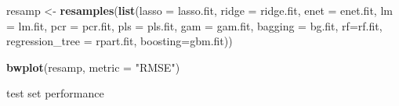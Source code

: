 \documentclass[]{article}
\newenvironment{Shaded}{\begin{snugshade}}{\end{snugshade}}
\newcommand{\DataTypeTok}[1]{\textcolor[rgb]{0.13,0.29,0.53}{#1}}
\newcommand{\KeywordTok}[1]{\textcolor[rgb]{0.13,0.29,0.53}{\textbf{#1}}}
\newcommand{\NormalTok}[1]{#1}
\newcommand{\StringTok}[1]{\textcolor[rgb]{0.31,0.60,0.02}{#1}}
\begin{document}
\begin{Shaded}
\begin{Highlighting}[]
\NormalTok{resamp <-}\StringTok{ }\KeywordTok{resamples}\NormalTok{(}\KeywordTok{list}\NormalTok{(}\DataTypeTok{lasso =}\NormalTok{ lasso.fit, }
                         \DataTypeTok{ridge =}\NormalTok{ ridge.fit,}
                         \DataTypeTok{enet =}\NormalTok{ enet.fit,}
                         \DataTypeTok{lm =}\NormalTok{ lm.fit,}
                         \DataTypeTok{pcr =}\NormalTok{ pcr.fit,}
                         \DataTypeTok{pls =}\NormalTok{ pls.fit,}
                         \DataTypeTok{gam =}\NormalTok{ gam.fit,}
                         \DataTypeTok{bagging =}\NormalTok{ bg.fit,}
                         \DataTypeTok{rf=}\NormalTok{rf.fit,}
                         \DataTypeTok{regression_tree =}\NormalTok{ rpart.fit,}
                         \DataTypeTok{boosting=}\NormalTok{gbm.fit))}

\KeywordTok{bwplot}\NormalTok{(resamp, }\DataTypeTok{metric =} \StringTok{"RMSE"}\NormalTok{)}
\end{Highlighting}
\end{Shaded}

test set performance
\end{document}
